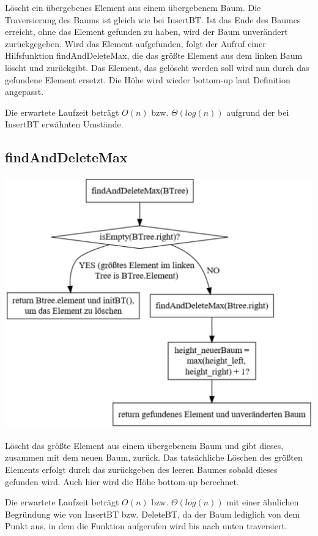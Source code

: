 \documentclass[11pt]{article}
\begin{document}
    Löscht ein übergebenes Element aus einem übergebenem Baum.
    Die Traversierung des Baums ist gleich wie bei InsertBT.
    Ist das Ende des Baumes erreicht, ohne das Element gefunden zu haben,
    wird der Baum unverändert zurückgegeben.
    Wird das Element aufgefunden, folgt der Aufruf einer Hilfsfunktion findAndDeleteMax, die das größte Element aus dem linken Baum löscht und zurückgibt. Das Element, das gelöscht werden soll wird nun durch das gefundene Element ersetzt. Die Höhe wird wieder bottom-up laut Definition angepasst.

    Die erwartete Laufzeit beträgt
    \begin{math}
        O(n)
    \end {math}
    bzw.
    \begin{math}
        \Theta (log (n))
    \end{math}
    aufgrund der bei InsertBT erwähnten Umstände.
    
    
    \subsection{findAndDeleteMax}\label{subsec:findanddeletemax}

    \begin{center}
        \includegraphics[width=0.65\columnwidth] {findanddeletemax.pdf}
    \end{center}

    Löscht das größte Element aus einem übergebenem Baum und gibt dieses, zusammen mit dem neuen Baum, zurück. Das tatsächliche Löschen des größten Elements erfolgt durch das zurückgeben des leeren Baumes sobald dieses gefunden wird. Auch hier wird die Höhe bottom-up berechnet.

    Die erwartete Laufzeit beträgt
    \begin{math}
        O(n)
    \end {math}
    bzw.
    \begin{math}
        \Theta (log (n))
    \end{math}
    mit einer ähnlichen Begründung wie von InsertBT bzw. DeleteBT, da der Baum lediglich von dem Punkt aus, in dem die Funktion aufgerufen wird bis nach unten traversiert.
    
\end{document}
